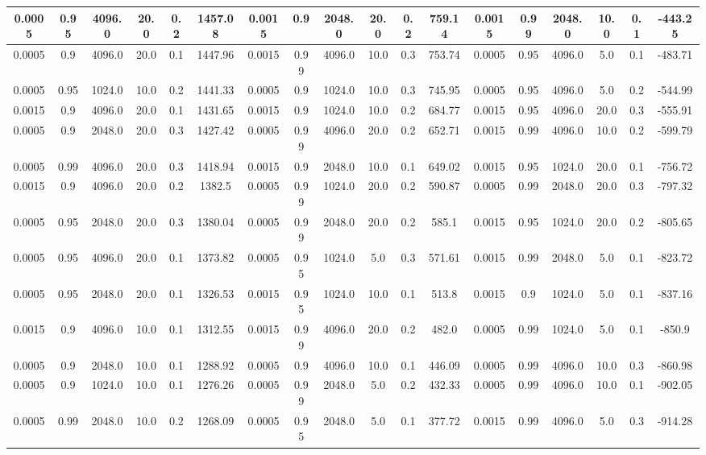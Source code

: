 \begin{table}[h]
{\begin{tabular}{|c|c|c|c|c|c||c|c|c|c|c|c||c|c|c|c|c|c|}
    \hline
    0.0005 & 0.95 & 4096.0 & 20.0 & 0.2 & 1457.08 & 0.0015 & 0.9 & 2048.0 & 20.0 & 0.2 & 759.14 & 0.0015 & 0.99 & 2048.0 & 10.0 & 0.1 & -443.25 \\
    \hline
    0.0005 & 0.9 & 4096.0 & 20.0 & 0.1 & 1447.96 & 0.0015 & 0.99 & 4096.0 & 10.0 & 0.3 & 753.74 & 0.0005 & 0.95 & 4096.0 & 5.0 & 0.1 & -483.71 \\
    \hline
    0.0005 & 0.95 & 1024.0 & 10.0 & 0.2 & 1441.33 & 0.0005 & 0.9 & 1024.0 & 10.0 & 0.3 & 745.95 & 0.0005 & 0.95 & 4096.0 & 5.0 & 0.2 & -544.99 \\
    \hline
    0.0015 & 0.9 & 4096.0 & 20.0 & 0.1 & 1431.65 & 0.0015 & 0.9 & 1024.0 & 10.0 & 0.2 & 684.77 & 0.0015 & 0.95 & 4096.0 & 20.0 & 0.3 & -555.91 \\
    \hline
    0.0005 & 0.9 & 2048.0 & 20.0 & 0.3 & 1427.42 & 0.0005 & 0.99 & 4096.0 & 20.0 & 0.2 & 652.71 & 0.0015 & 0.99 & 4096.0 & 10.0 & 0.2 & -599.79 \\
    \hline
    0.0005 & 0.99 & 4096.0 & 20.0 & 0.3 & 1418.94 & 0.0015 & 0.9 & 2048.0 & 10.0 & 0.1 & 649.02 & 0.0015 & 0.95 & 1024.0 & 20.0 & 0.1 & -756.72 \\
    \hline
    0.0015 & 0.9 & 4096.0 & 20.0 & 0.2 & 1382.5 & 0.0005 & 0.99 & 1024.0 & 20.0 & 0.2 & 590.87 & 0.0005 & 0.99 & 2048.0 & 20.0 & 0.3 & -797.32 \\
    \hline
    0.0005 & 0.95 & 2048.0 & 20.0 & 0.3 & 1380.04 & 0.0005 & 0.99 & 2048.0 & 20.0 & 0.2 & 585.1 & 0.0015 & 0.95 & 1024.0 & 20.0 & 0.2 & -805.65 \\
    \hline
    0.0005 & 0.95 & 4096.0 & 20.0 & 0.1 & 1373.82 & 0.0005 & 0.95 & 1024.0 & 5.0 & 0.3 & 571.61 & 0.0015 & 0.99 & 2048.0 & 5.0 & 0.1 & -823.72 \\
    \hline
    0.0005 & 0.95 & 2048.0 & 20.0 & 0.1 & 1326.53 & 0.0015 & 0.95 & 1024.0 & 10.0 & 0.1 & 513.8 & 0.0015 & 0.9 & 1024.0 & 5.0 & 0.1 & -837.16 \\
    \hline
    0.0015 & 0.9 & 4096.0 & 10.0 & 0.1 & 1312.55 & 0.0015 & 0.99 & 4096.0 & 20.0 & 0.2 & 482.0 & 0.0005 & 0.99 & 1024.0 & 5.0 & 0.1 & -850.9 \\
    \hline
    0.0005 & 0.9 & 2048.0 & 10.0 & 0.1 & 1288.92 & 0.0005 & 0.9 & 4096.0 & 10.0 & 0.1 & 446.09 & 0.0005 & 0.99 & 4096.0 & 10.0 & 0.3 & -860.98 \\
    \hline
    0.0005 & 0.9 & 1024.0 & 10.0 & 0.1 & 1276.26 & 0.0005 & 0.99 & 2048.0 & 5.0 & 0.2 & 432.33 & 0.0005 & 0.99 & 4096.0 & 10.0 & 0.1 & -902.05 \\
    \hline
    0.0005 & 0.99 & 2048.0 & 10.0 & 0.2 & 1268.09 & 0.0005 & 0.95 & 2048.0 & 5.0 & 0.1 & 377.72 & 0.0015 & 0.99 & 4096.0 & 5.0 & 0.3 & -914.28 \\

\end{tabular}}
\end{table}
